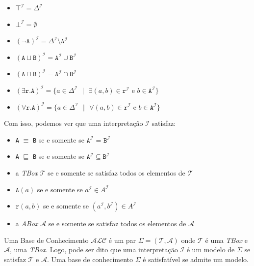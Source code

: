 \begin{itemize}
	\item $ \top^\mathcal{I} = \Delta^\mathcal{I} $
	\item $ \bot^\mathcal{I} = \emptyset $
	\item $ (\neg \texttt{A})^\mathcal{I} = \Delta^\mathcal{I} \setminus \texttt{A}^\mathcal{I}  $
	\item $(\texttt{A} \sqcup \texttt{B})^\mathcal{I} = \texttt{A}^\mathcal{I} \cup \texttt{B}^\mathcal{I}$  
	\item $(\texttt{A} \sqcap \texttt{B})^\mathcal{I} = \texttt{A}^\mathcal{I} \cap \texttt{B}^\mathcal{I}$
	\item $(\exists \texttt{r.A})^\mathcal{I} = \{a \in \Delta^\mathcal{I}\text{ }|\text{ }\exists(a, b) \in \texttt{r}^\mathcal{I} \text{ e } b \in \texttt{A}^\mathcal{I}\}$  
	\item $(\forall \texttt{r.A})^\mathcal{I} = \{a \in \Delta^\mathcal{I}\text{ }|\text{ }\forall(a, b) \in \texttt{r}^\mathcal{I} \text{ e } b \in \texttt{A}^\mathcal{I}\}$
\end{itemize}

Com isso, podemos ver que uma interpretação $ \mathcal{I} $ satisfaz:

\begin{multicols}{2}
	\begin{itemize}
		\item \texttt{A} $ \equiv $ \texttt{B} se e somente se $ \texttt{A}^\mathcal{I} $ = $ \texttt{B}^\mathcal{I} $ 
		\item \texttt{A} $ \sqsubseteq $ \texttt{B} se e somente se $ \texttt{A}^\mathcal{I} \subseteq \texttt{B}^\mathcal{I} $
		\item a \textit{TBox} $ \mathcal{T} $ se e somente se satisfaz todos os elementos de $ \mathcal{T} $
		\item $ \texttt{A}(a) $ se e somente se $ a^\mathcal{I} \in A^\mathcal{I} $
		\item $ \texttt{r}(a, b) $ se e somente se $ (a^\mathcal{I}, b^\mathcal{I}) \in A^\mathcal{I} $
		\item a \textit{ABox} $ \mathcal{A} $ se e somente se satisfaz todos os elementos de $ \mathcal{A} $
	\end{itemize}
\end{multicols}

Uma Base de Conhecimento $ \mathcal{ALC} $ é um par $ \Sigma = (\mathcal{T}, \mathcal{A}) $ onde $ \mathcal{T} $ é uma \textit{TBox} e $ \mathcal{A} $, uma \textit{TBox}. Logo, pode ser dito que uma interpretação $ \mathcal{I} $ é um modelo de $ \Sigma $ se satisfaz $ \mathcal{T} $ e $ \mathcal{A} $. Uma base de conhecimento $ \Sigma $ é satisfatível se admite um modelo.


